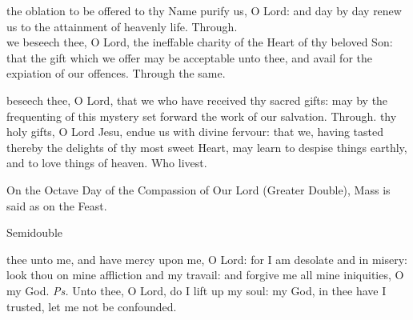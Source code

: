 
\secret
{} the oblation to be offered to thy Name purify us, O Lord: and day by day renew us to the attainment of heavenly life. Through.\\

 we beseech thee, O Lord, the ineffable charity of the Heart of thy beloved Son: that the gift which we offer may be acceptable unto thee, and avail for the expiation of our offences. Through the same.


\postcommunion
{} beseech thee, O Lord, that we who have received thy sacred gifts: may by the frequenting of this mystery set forward the work of our salvation. Through.
 thy holy gifts, O Lord Jesu, endue us with divine fervour: that we, having tasted thereby the delights of thy most sweet Heart, may learn to despise things earthly, and to love things of heaven. Who livest.
\begin{rubric}
    On the Octave Day of the Compassion of Our Lord (Greater Double), Mass is said as on the Feast.
\end{rubric}

\label{TrinityIII}
\begin{inhead}
    {Semidouble}
\end{inhead}
\par\noindent
{}



\properantiphonfix

\introit
{} thee unto me, and have mercy upon me, O Lord: for I am desolate and in misery: look thou on mine affliction and my travail: and forgive me all mine iniquities, O my God. \textit{Ps.} Unto thee, O Lord, do I lift up my soul: my God, in thee have I trusted, let me not be confounded.


